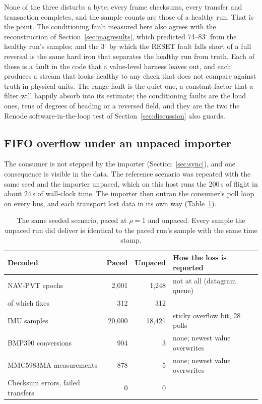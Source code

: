 \documentclass[preprint,12pt,a4paper]{elsarticle}
\begin{document}
None of the three disturbs a byte: every frame checksums, every transfer and
transaction completes, and the sample counts are those of a healthy run. That
is the point. The conditioning fault measured here also agrees with the
reconstruction of Section~\ref{sec:magresults}, which predicted
74--83$^\circ$ from the healthy run's samples; and the $3^\circ$ by which the
RESET fault falls short of a full reversal is the same hard iron that
separates the healthy run from truth. Each of these is a fault in the code that a value-level harness
leaves out, and each produces a stream that looks healthy to any check that
does not compare against truth in physical units. The range fault is the
quiet one, a constant factor that a filter will happily absorb into its
estimate; the conditioning faults are the loud ones, tens of degrees of
heading or a reversed field, and they are the two the Renode
software-in-the-loop test of Section~\ref{sec:discussion} also guards.

\subsection{FIFO overflow under an unpaced importer}
\label{sec:fifo}
The consumer is not stepped by the importer (Section~\ref{sec:sync}), and one
consequence is visible in the data. The reference scenario was repeated with
the same seed and the importer unpaced, which on this host runs the 200\,s of
flight in about 24\,s of wall-clock time. The importer then outran the
consumer's poll loop on every bus, and each transport lost data in its own
way (Table~\ref{tab:unpaced}).

\begin{table}[tbp]
\centering
\caption{The same seeded scenario, paced at $\rho=1$ and unpaced. Every sample
the unpaced run did deliver is identical to the paced run's sample with the
same time stamp.}
\label{tab:unpaced}
\footnotesize
\setlength{\tabcolsep}{4pt}
\begin{tabular}{@{}lrrl@{}}
\toprule
Decoded & Paced & Unpaced & How the loss is reported\\
\midrule
NAV-PVT epochs        & 2{,}001  & 1{,}248  & not at all (datagram queue)\\
\quad of which fixes  & 312      & 312      & \\
IMU samples           & 20{,}000 & 18{,}421 & sticky overflow bit, 28 polls\\
BMP390 conversions    & 904      & 3        & none; newest value overwrites\\
MMC5983MA measurements& 878      & 5        & none; newest value overwrites\\
Checksum errors, failed transfers & 0 & 0 & \\
\bottomrule
\end{tabular}
\end{table}
\end{document}
